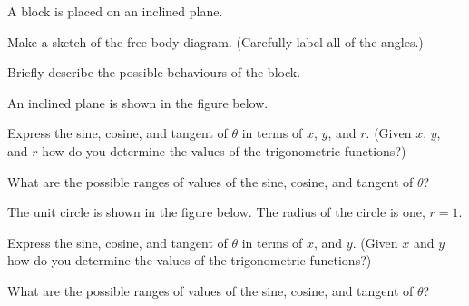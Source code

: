 \begin{problem}
\item A block is placed on an inclined plane.

  \scalebox{0.35}{}

  \begin{subproblem}
    \item Make a sketch of the free body diagram. (Carefully label all of the angles.)
      \vfill
      \vfill
    \item Briefly describe the possible behaviours of the block.
      \vfill
  \end{subproblem}

  \clearpage

\item An inclined plane is shown in the figure below.

  \scalebox{0.35}{}

  \begin{subproblem}
  \item Express the sine, cosine, and tangent of $\theta$ in terms of
    $x$, $y$, and $r$. (Given $x$, $y$, and $r$ how do you determine
    the values of the trigonometric functions?)
    \vfill
  \item What are the possible ranges of values of the sine, cosine, and tangent
    of $\theta$?
    \vspace{8em}
  \end{subproblem}

  \clearpage

\item The unit circle is shown in the figure below. The radius of the
  circle is one, $r=1$.

  \scalebox{0.35}{}

  \begin{subproblem}
  \item Express the sine, cosine, and tangent of $\theta$ in terms of
    $x$, and $y$. (Given $x$ and $y$ how do you determine the values
    of the trigonometric functions?)  
    \vfill
  \item What are the possible ranges of values of the sine, cosine, and tangent
    of $\theta$?
    \vspace{8em}
  \end{subproblem}


\end{problem}


